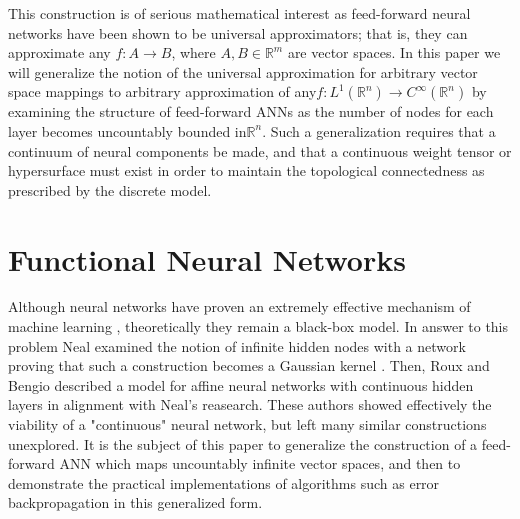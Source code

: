 \documentclass{ib-assignment}
\begin{document}
This construction is of serious mathematical interest as feed-forward neural networks have been shown to be universal approximators; that is, they can approximate any \(f:A\to B\), where \(A,B \in \mathbb{R}^m\) are vector spaces.  In this paper we will generalize the notion of the universal approximation for arbitrary vector space mappings to arbitrary approximation of any\(f:L^1 (\mathbb{R}^n)\to C^\infty(\mathbb{R}^n)\) by examining the structure of feed-forward ANNs as the number of nodes for each layer becomes uncountably bounded in\(\mathbb{R}^n\). Such a generalization requires that a continuum of neural components be made, and that a continuous weight tensor or hypersurface must exist in order to maintain the topological connectedness as prescribed by the discrete model. 




\newpage
\section{Functional Neural Networks}
Although neural networks have proven an extremely effective mechanism of machine learning \cite{mlsurvey}, theoretically they remain a black-box model.  In answer to this problem Neal examined the notion of infinite hidden nodes with a network proving that such a construction becomes a Gaussian kernel \cite{neal}. Then, Roux and Bengio described a model for affine neural networks with continuous hidden layers in alignment with Neal's reasearch. These authors showed effectively the viability of a "continuous" neural network, but left many similar constructions unexplored. It is the subject of this paper to generalize the construction of a feed-forward ANN which maps uncountably infinite vector spaces, and then to demonstrate the practical implementations of algorithms such as error backpropagation in this generalized form.
\end{document}
